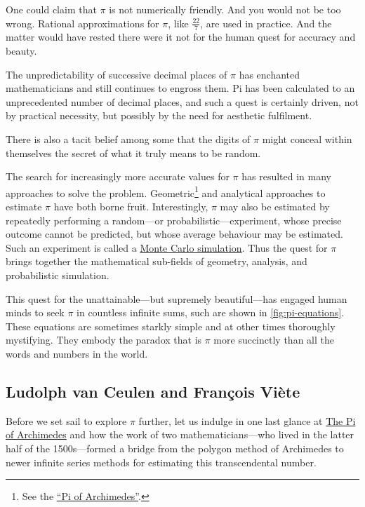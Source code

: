\documentclass[
  a4paper,
]{article}
\begin{document}
One could claim that \(\pi\) is not numerically friendly. And you would
not be too wrong. Rational approximations for \(\pi\), like
\(\frac{22}{7}\), are used in practice. And the matter would have rested
there were it not for the human quest for accuracy and beauty.

The unpredictability of successive decimal places of \(\pi\) has
enchanted mathematicians and still continues to engross them. Pi has
been calculated to an unprecedented number of decimal places, and such a
quest is certainly driven, not by practical necessity, but possibly by
the need for aesthetic fulfilment.

There is also a tacit belief among some that the digits of \(\pi\) might
conceal within themselves the secret of what it truly means to be
random.

The search for increasingly more accurate values for \(\pi\) has
resulted in many approaches to solve the problem. Geometric\footnote{See
  the
  \href{https://swanlotus.netlify.app/blogs/the-pi-of-archimedes}{``Pi
  of Archimedes''}.} and analytical approaches to estimate \(\pi\) have
both borne fruit. Interestingly, \(\pi\) may also be estimated by
repeatedly performing a random---or probabilistic---experiment, whose
precise outcome cannot be predicted, but whose average behaviour may be
estimated. Such an experiment is called a
\href{https://www.ibm.com/topics/monte-carlo-simulation}{Monte Carlo
simulation}. Thus the quest for \(\pi\) brings together the mathematical
sub-fields of geometry, analysis, and probabilistic simulation.

This quest for the unattainable---but supremely beautiful---has engaged
human minds to seek \(\pi\) in countless infinite sums, such are shown
in \cref{fig:pi-equations}. These equations are sometimes starkly simple
and at other times thoroughly mystifying. They embody the paradox that
is \(\pi\) more succinctly than all the words and numbers in the world.

\subsection{Ludolph van Ceulen and François
Viète}\label{ludolph-van-ceulen-and-franuxe7ois-viuxe8te}

Before we set sail to explore \(\pi\) further, let us indulge in one
last glance at
\href{https://swanlotus.netlify.app/blogs/the-pi-of-archimedes}{The Pi
of Archimedes} and how the work of two mathematicians---who lived in the
latter half of the 1500s---formed a bridge from the polygon method of
Archimedes to newer infinite series methods for estimating this
transcendental number.
\end{document}
